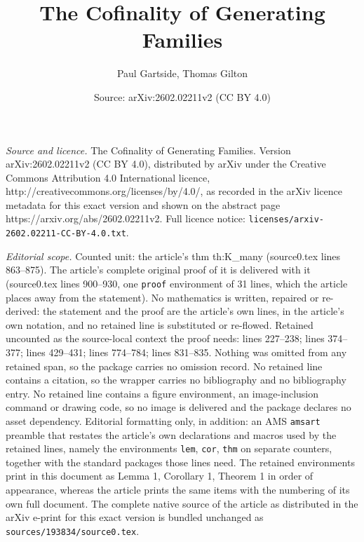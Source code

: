 \documentclass[10pt,a4paper]{amsart}
\title{The Cofinality of Generating Families}
\author{Paul Gartside, Thomas Gilton}
\date{Source: arXiv:2602.02211v2 (CC BY 4.0)}
\begin{document}
\maketitle

\noindent\emph{Source and licence.} The Cofinality of Generating Families. Version arXiv:2602.02211v2 (CC BY 4.0), distributed by arXiv under the Creative Commons Attribution 4.0 International licence, http://creativecommons.org/licenses/by/4.0/, as recorded in the arXiv licence metadata for this exact version and shown on the abstract page https://arxiv.org/abs/2602.02211v2. Full licence notice: \texttt{licenses/arxiv-2602.02211-CC-BY-4.0.txt}.\par\smallskip

\noindent\textit{Editorial scope.} Counted unit: the article's thm th:K\_many (source0.tex lines 863--875). The article's complete original proof of it is delivered with it (source0.tex lines 900--930, one \texttt{proof} environment of 31 lines, which the article places away from the statement). No mathematics is written, repaired or re-derived: the statement and the proof are the article's own lines, in the article's own notation, and no retained line is substituted or re-flowed.  Retained uncounted as the source-local context the proof needs: lines 227--238; lines 374--377; lines 429--431; lines 774--784; lines 831--835.  Nothing was omitted from any retained span, so the package carries no omission record.  No retained line contains a citation, so the wrapper carries no bibliography and no bibliography entry.  No retained line contains a figure environment, an image-inclusion command or drawing code, so no image is delivered and the package declares no asset dependency.  Editorial formatting only, in addition: an AMS \texttt{amsart} preamble that restates the article's own declarations and macros used by the retained lines, namely the environments \texttt{lem}, \texttt{cor}, \texttt{thm} on separate counters, together with the standard packages those lines need.  The retained environments print in this document as Lemma 1, Corollary 1, Theorem 1 in order of appearance, whereas the article prints the same items with the numbering of its own full document.  The complete native source of the article as distributed in the arXiv e-print for this exact version is bundled unchanged as \texttt{sources/193834/source0.tex}.
\end{document}
